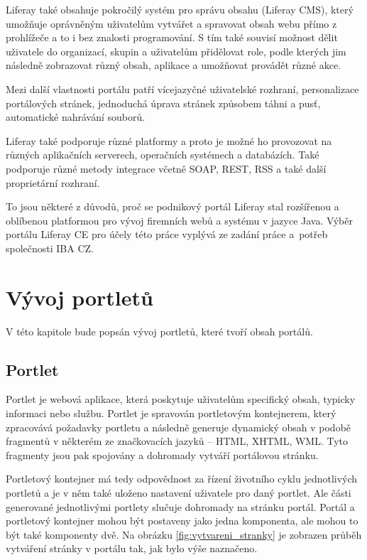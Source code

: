 \documentclass{fithesis}
\begin{document}
Liferay také obsahuje pokročilý systém pro správu obsahu (Liferay CMS), který umožňuje oprávněným uživatelům vytvářet a spravovat obsah webu přímo z prohlížeče a to i bez znalosti programování. S tím také souvisí možnost dělit uživatele do organizací, skupin a uživatelům přidělovat role, podle kterých jim následně zobrazovat různý obsah, aplikace a umožňovat provádět různé akce.

Mezi další vlastnosti portálu patří vícejazyčné uživatelské rozhraní, personalizace portálových stránek, jednoduchá úprava stránek způsobem táhni a pusť, automatické nahrávání souborů.

Liferay také podporuje různé platformy a proto je možné ho provozovat na různých aplikačních serverech, operačních systémech a databázích. Také podporuje různé metody integrace včetně SOAP, REST, RSS a také další proprietární rozhraní.\cite{liferay-features}

To jsou některé z důvodů, proč se podnikový portál Liferay stal rozšířenou a oblíbenou platformou pro vývoj firemních webů a systému v jazyce Java. Výběr portálu Liferay CE pro účely této práce vyplývá ze zadání práce a~potřeb společnosti IBA CZ.


\chapter{Vývoj portletů}
V této kapitole bude popsán vývoj portletů, které tvoří obsah portálů.

\section{Portlet}
Portlet je webová aplikace, která poskytuje uživatelům specifický obsah, typicky informaci nebo službu. Portlet je spravován portletovým kontejnerem, který zpracovává požadavky portletu a následně generuje dynamický obsah v podobě fragmentů v některém ze značkovacích jazyků -- HTML, XHTML, WML. Tyto fragmenty jsou pak spojovány a dohromady vytváří portálovou stránku.

Portletový kontejner má tedy odpovědnost za řízení životního cyklu jednotlivých portletů a je v něm také uloženo nastavení uživatele pro daný portlet. Ale části generované jednotlivými portlety slučuje dohromady na stránku portál. Portál a portletový kontejner mohou být postaveny jako jedna komponenta, ale mohou to být také komponenty dvě. Na obrázku \ref{fig:vytvareni_stranky} je zobrazen průběh vytváření stránky v portálu tak, jak bylo výše naznačeno.
\end{document}

